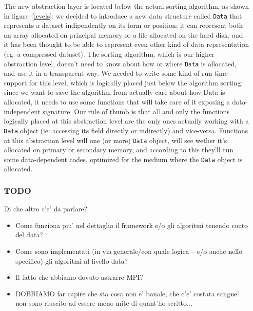 The new abstraction layer is located below the actual sorting algorithm, as shown in figure~\ref{levels}: we decided to introduce a new data structure called \texttt{Data} that represents a dataset indipendently on its form or position: it can represent both an array allocated on principal memory or a file allocated on the hard disk, and it has been thought to be able to represent even other kind of data representation (eg: a compressed dataset). The sorting algorithm, which is our higher abstraction level, doesn't need to know about how or where \texttt{Data} is allocated, and use it in a transparent way.
We needed to write some kind of run-time support for this level, which is logically placed just below the algorithm sorting: since we want to save the algorithm from actually care about how Data is allocated, it needs to use some functions that will take care of it exposing a data-independent signature. Our rule of thumb is that all and only the functions logically placed at this abstraction level are the only ones actually working with a \texttt{Data} object (ie: accessing its field directly or indirectly) and vice-versa.
Functions at this abstraction level will one (or more) \texttt{Data} object, will see wether it's allocated on primary or secondary memory, and according to this they'll run some data-dependent codes, optimized for the medium where the \texttt{Data} object is allocated.

\subsubsection*{TODO}
Di che altro c'e' da parlare?
\begin{itemize}
	\item{Come funziona piu' nel dettaglio il framework e/o gli algoritmi tenendo conto del data?}
	\item{Come sono implementati (in via generale/con quale logica -- e/o anche nello specifico) gli algoritmi al livello data?}
	\item{Il fatto che abbiamo dovuto astrarre MPI?}
	\item{DOBBIAMO far capire che sta cosa non e' banale, che c'e' costata sangue! non sono riuscito ad essere meno mite di quant'ho scritto...}
\end{itemize}


